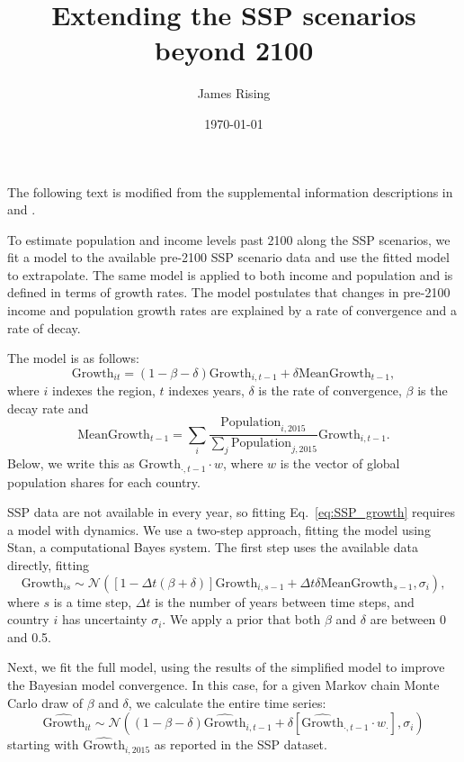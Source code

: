 \documentclass[12pt,english]{article}
\title{Extending the SSP scenarios beyond 2100}
\author{James Rising}
\date{\today}
\begin{document}
\maketitle

The following text is modified from the supplemental information
descriptions in \citet{dietz2021tipping} and
\citet{kikstra2021tipping}.

To estimate population and income levels past 2100 along the SSP
scenarios, we fit a model to the available pre-2100 SSP scenario data
and use the fitted model to extrapolate. The same model is applied to
both income and population and is defined in terms of growth
rates. The model postulates that changes in pre-2100 income and
population growth rates are explained by a rate of convergence and a
rate of decay.

The model is as follows:
\begin{equation}\label{eq:SSP_growth}
    \text{Growth}_{it} = (1 - \beta - \delta) \text{Growth}_{i,t-1} + \delta \text{MeanGrowth}_{t-1},
  \end{equation}
  where $i$ indexes the region, $t$ indexes years, $\delta$ is the rate of convergence, $\beta$ is the decay rate and
\begin{equation}
    \text{MeanGrowth}_{t-1} = \sum_i \frac{\text{Population}_{i, 2015}}{\sum_j \text{Population}_{j, 2015}} \text{Growth}_{i,t-1}.
\end{equation}
Below, we write this as $\text{Growth}_{\cdot, t-1} \cdot w$, where $w$ is the vector of global population shares for each country.

SSP data are not available in every year, so fitting Eq.\ \eqref{eq:SSP_growth} requires a model with dynamics. We use a two-step approach, fitting the model using Stan, a computational Bayes system. The first step uses the available data directly, fitting
\begin{equation}
    \text{Growth}_{is} \sim \mathcal{N}\left( [1 - \Delta t (\beta + \delta)] \text{Growth}_{i, s-1} + \Delta t \delta \text{MeanGrowth}_{s-1}, \sigma_i\right),
\end{equation}
where $s$ is a time step, $\Delta t$ is the number of years between
time steps, and country $i$ has uncertainty $\sigma_i$. We apply a
prior that both $\beta$ and $\delta$ are between 0 and 0.5.

Next, we fit the full model, using the results of the simplified model to improve the Bayesian model convergence. In this case, for a given Markov chain Monte Carlo draw of $\beta$ and $\delta$, we calculate the entire time series:
\begin{equation}
    \widehat{\text{Growth}}_{it} \sim \mathcal{N}\left((1 - \beta - \delta) \widehat{\text{Growth}}_{i,t-1} + \delta \left[\widehat{\text{Growth}}_{\cdot, t-1} \cdot w_\cdot\right], \sigma_i\right)
\end{equation}
starting with $\widehat{\text{Growth}}_{i, 2015}$ as reported in the SSP dataset.
\end{document}
